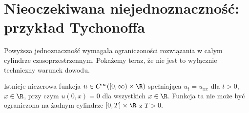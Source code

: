 \section{Nieoczekiwana niejednoznaczność: przykład Tychonoffa}
\label{sec:pde4-tychonoff}

Powyższa jednoznaczność wymagała ograniczoności
rozwiązania w całym cylindrze czasoprzestrzennym.
Pokażemy teraz, że nie jest to wyłącznie techniczny
warunek dowodu.

\begin{twierdzenie}
\label{thm:pde4-tychonoff}
Istnieje niezerowa funkcja
$u\in C^\infty([0,\infty)\times\R)$
spełniająca $u_t=u_{xx}$ dla $t>0$, $x\in\R$,
przy czym $u(0,x)=0$ dla wszystkich $x\in\R$.
Funkcja ta nie może być ograniczona na żadnym
cylindrze $[0,T]\times\R$ z $T>0$.
\end{twierdzenie}
